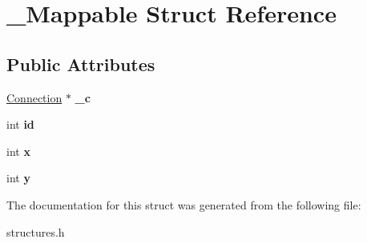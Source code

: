 \hypertarget{struct__Mappable}{
\section{\_\-Mappable Struct Reference}
\label{struct__Mappable}
}
\subsection*{Public Attributes}
\begin{DoxyCompactItemize}
\item 
\hypertarget{struct__Mappable_a7ec82fd98d694fbdbb8c61f9d43f1b5b}{
\hyperlink{structConnection}{Connection} $\ast$ {\bfseries \_\-c}}
\label{struct__Mappable_a7ec82fd98d694fbdbb8c61f9d43f1b5b}

\item 
\hypertarget{struct__Mappable_aad5451cf1ea111ea63c72fbeedeef1cc}{
int {\bfseries id}}
\label{struct__Mappable_aad5451cf1ea111ea63c72fbeedeef1cc}

\item 
\hypertarget{struct__Mappable_a99b450814ecd057e5f0dd7f47f443e8e}{
int {\bfseries x}}
\label{struct__Mappable_a99b450814ecd057e5f0dd7f47f443e8e}

\item 
\hypertarget{struct__Mappable_a941d0fc2565e112b4e05b2a40f65f30f}{
int {\bfseries y}}
\label{struct__Mappable_a941d0fc2565e112b4e05b2a40f65f30f}

\end{DoxyCompactItemize}


The documentation for this struct was generated from the following file:\begin{DoxyCompactItemize}
\item 
structures.h\end{DoxyCompactItemize}
